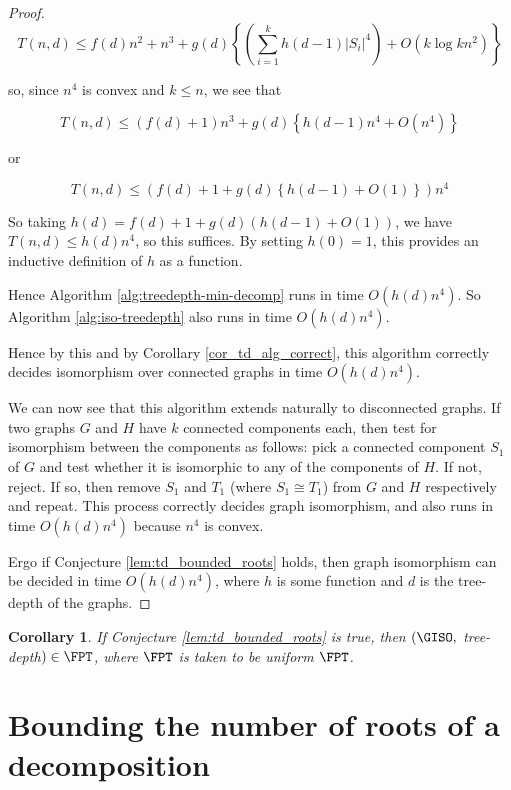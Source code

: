 \documentclass[11pt]{report}
\newtheorem{cor}{Corollary}
\begin{document}
\begin{proof}
	\[T(n,d) \leq f(d)n^2 + n^3 + g(d)\left\{\left(\displaystyle \sum_{i=1}^{k} h(d-1) |S_i|^4\right) +  O(k\log k n^2)\right\} \]
 
so, since $n^4$ is convex and $k\leq n$, we see that

\[T(n,d) \leq  (f(d)+1)n^3 + g(d)\left\{  h(d-1)n^4 +  O(n^4)\right\}\]

or

\[T(n,d) \leq  \left(f(d)+1 + g(d)\left\{  h(d-1)+  O(1)\right\}\right) n^4 \]

So taking $h(d) = f(d)+1+g(d)\left(h(d-1) + O(1)\right)$, we have $T(n,d)\leq h(d)n^4$, so this suffices. By setting $h(0)=1$, this provides an inductive definition of $h$ as a function.



Hence Algorithm \ref{alg:treedepth-min-decomp} runs in time $O(h(d)n^4)$. So Algorithm \ref{alg:iso-treedepth} also runs in time $O(h(d)n^4)$. 

Hence by this and by Corollary \ref{cor_td_alg_correct}, this algorithm correctly decides isomorphism over connected graphs in time $O(h(d)n^4)$.

We can now see that this algorithm extends naturally to disconnected graphs. If two graphs $G$ and $H$ have $k$ connected components each, then test for isomorphism between the components as follows: pick a connected component $S_1$ of $G$ and test  whether it is isomorphic to any of the components of $H$. If not, reject. If so, then remove $S_1$ and $T_1$ (where $S_1 \cong T_1$) from $G$ and $H$ respectively and repeat. This process correctly decides graph isomorphism, and also runs in time $O(h(d)n^4)$ because $n^4$ is convex.

Ergo if Conjecture \ref{lem:td_bounded_roots} holds, then graph isomorphism can be decided in time $O(h(d)n^4)$, where $h$ is some function and $d$ is the tree-depth of the graphs.
\end{proof}

\begin{cor} If Conjecture \ref{lem:td_bounded_roots} is true, then $(\GISO, $ tree-depth$)\in \FPT$, where $\FPT$ is taken to be uniform $\FPT$.
\end{cor}














\section{Bounding the number of roots of a decomposition}
\end{document}
